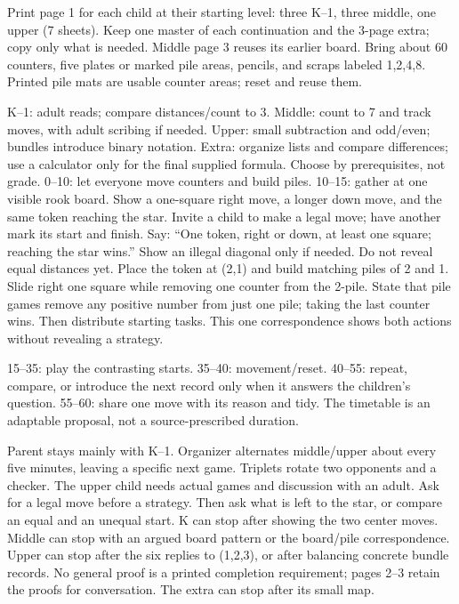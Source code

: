 \documentclass[11pt]{article}
\begin{document}
Print page 1 for each child at their starting level: three K--1, three middle, one upper (7 sheets). Keep one master of each continuation and the 3-page extra; copy only what is needed. Middle page 3 reuses its earlier board. Bring about 60 counters, five plates or marked pile areas, pencils, and scraps labeled 1,2,4,8. Printed pile mats are usable counter areas; reset and reuse them.

K--1: adult reads; compare distances/count to 3. Middle: count to 7 and track moves, with adult scribing if needed. Upper: small subtraction and odd/even; bundles introduce binary notation. Extra: organize lists and compare differences; use a calculator only for the final supplied formula. Choose by prerequisites, not grade.
0--10: let everyone move counters and build piles. 10--15: gather at one visible rook board. Show a one-square right move, a longer down move, and the same token reaching the star. Invite a child to make a legal move; have another mark its start and finish. Say: ``One token, right or down, at least one square; reaching the star wins.'' Show an illegal diagonal only if needed. Do not reveal equal distances yet. Place the token at (2,1) and build matching piles of 2 and 1. Slide right one square while removing one counter from the 2-pile. State that pile games remove any positive number from just one pile; taking the last counter wins. Then distribute starting tasks. This one correspondence shows both actions without revealing a strategy.

15--35: play the contrasting starts. 35--40: movement/reset. 40--55: repeat, compare, or introduce the next record only when it answers the children's question. 55--60: share one move with its reason and tidy. The timetable is an adaptable proposal, not a source-prescribed duration.

Parent stays mainly with K--1. Organizer alternates middle/upper about every five minutes, leaving a specific next game. Triplets rotate two opponents and a checker. The upper child needs actual games and discussion with an adult.
Ask for a legal move before a strategy. Then ask what is left to the star, or compare an equal and an unequal start. K can stop after showing the two center moves. Middle can stop with an argued board pattern or the board/pile correspondence. Upper can stop after the six replies to (1,2,3), or after balancing concrete bundle records. No general proof is a printed completion requirement; pages 2--3 retain the proofs for conversation. The extra can stop after its small map.
\newpage
\end{document}
